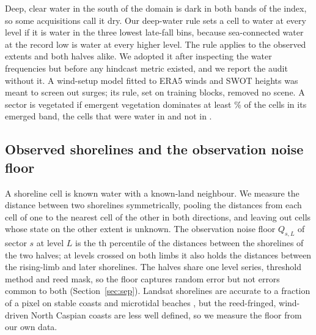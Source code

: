 Deep, clear water in the south of the domain is dark in both bands of the index, so some acquisitions call it dry. Our deep-water rule sets a cell to water at every level if it is water in the three lowest late-fall bins, because sea-connected water at the record low is water at every higher level. The rule applies to the observed extents and both halves alike. We adopted it after inspecting the water frequencies but before any hindcast metric existed, and we report the audit without it. A wind-setup model fitted to ERA5 winds \citep{hersbach2020} and SWOT heights was meant to screen out surges; its rule, set on training blocks, removed no scene.  A sector is vegetated if emergent vegetation dominates at least \% of the cells in its emerged band, the cells that were water in  and not in .

\subsection{Observed shorelines and the observation noise floor}
\label{sec:floor}
A shoreline cell is known water with a known-land neighbour. We measure the distance between two shorelines symmetrically, pooling the distances from each cell of one to the nearest cell of the other in both directions, and leaving out cells whose state on the other extent is unknown. The observation noise floor $Q_{s,L}$ of sector $s$ at level $L$ is the th percentile of the distances between the shorelines of the two halves; at levels crossed on both limbs it also holds the distances between the rising-limb and later shorelines. The halves share one level series, threshold method and reed mask, so the floor  captures random error but not errors common to both (Section~\ref{sec:sep}).  Landsat shorelines are accurate to a fraction of a pixel on stable coasts \citep{pardopascual2012} and microtidal beaches \citep{vos2023}, but the reed-fringed, wind-driven North Caspian coasts are less well defined, so we measure the floor from our own data.

